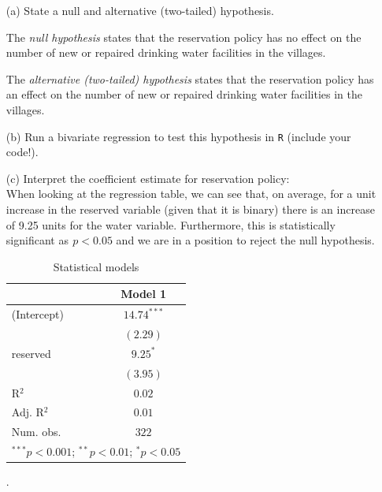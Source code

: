 \documentclass[12pt,letterpaper]{article}
\begin{document}
\newpage
\begin{enumerate}
	\item [(a)] State a null and alternative (two-tailed) hypothesis. 
	
	The \emph{null hypothesis} states that the reservation policy has no effect on the number of new or repaired drinking water facilities in the villages.
	
	The \emph{alternative (two-tailed) hypothesis} states that the reservation policy has an effect on the number of new or repaired drinking water facilities in the villages.
	\item [(b)] Run a bivariate regression to test this hypothesis in \texttt{R} (include your code!).
	
		  

	
	\item [(c)]  Interpret the coefficient estimate for reservation policy: \\ 	
	When looking at the regression table, we can see that, on average, for a unit increase in the reserved variable (given that it is binary) there is an increase of 9.25 units for the water variable. Furthermore, this is statistically significant as $^{}p<0.05$ and we are in a position to reject the null hypothesis.
	
	    \begin{table}[h!]
        \centering
        \begin{tabular}{l c}
            \hline
            & Model 1 \\
            \hline
            (Intercept) & $14.74^{***}$ \\
                        & $(2.29)$      \\
            reserved    & $9.25^{*}$    \\
                        & $(3.95)$      \\
            \hline
            R$^2$       & $0.02$        \\
            Adj. R$^2$  & $0.01$        \\
            Num. obs.   & $322$         \\
            \hline
            \multicolumn{2}{l}{\scriptsize{$^{***}p<0.001$; $^{**}p<0.01$; $^{*}p<0.05$}}
        \end{tabular}
        \caption{Statistical models}
        \label{table:coefficients}
    \end{table}
. 
	
	
\end{enumerate}
\end{document}
